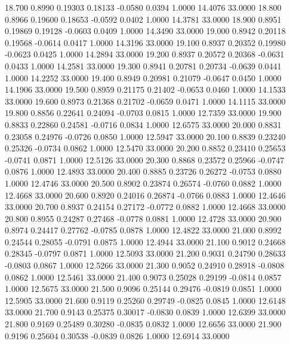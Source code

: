   18.700   0.8990   0.19303   0.18133  -0.0580   0.0394   1.0000  14.4076  33.0000
  18.800   0.8966   0.19600   0.18653  -0.0592   0.0402   1.0000  14.3781  33.0000
  18.900   0.8951   0.19869   0.19128  -0.0603   0.0409   1.0000  14.3490  33.0000
  19.000   0.8942   0.20118   0.19568  -0.0614   0.0417   1.0000  14.3196  33.0000
  19.100   0.8937   0.20352   0.19980  -0.0623   0.0425   1.0000  14.2894  33.0000
  19.200   0.8937   0.20572   0.20368  -0.0631   0.0433   1.0000  14.2581  33.0000
  19.300   0.8941   0.20781   0.20734  -0.0639   0.0441   1.0000  14.2252  33.0000
  19.400   0.8949   0.20981   0.21079  -0.0647   0.0450   1.0000  14.1906  33.0000
  19.500   0.8959   0.21175   0.21402  -0.0653   0.0460   1.0000  14.1533  33.0000
  19.600   0.8973   0.21368   0.21702  -0.0659   0.0471   1.0000  14.1115  33.0000
  19.800   0.8856   0.22641   0.24094  -0.0703   0.0815   1.0000  12.7359  33.0000
  19.900   0.8833   0.22860   0.24581  -0.0716   0.0834   1.0000  12.6575  33.0000
  20.000   0.8831   0.23058   0.24976  -0.0726   0.0850   1.0000  12.5947  33.0000
  20.100   0.8839   0.23240   0.25326  -0.0734   0.0862   1.0000  12.5470  33.0000
  20.200   0.8852   0.23410   0.25653  -0.0741   0.0871   1.0000  12.5126  33.0000
  20.300   0.8868   0.23572   0.25966  -0.0747   0.0876   1.0000  12.4893  33.0000
  20.400   0.8885   0.23726   0.26272  -0.0753   0.0880   1.0000  12.4746  33.0000
  20.500   0.8902   0.23874   0.26574  -0.0760   0.0882   1.0000  12.4668  33.0000
  20.600   0.8920   0.24016   0.26874  -0.0766   0.0883   1.0000  12.4646  33.0000
  20.700   0.8937   0.24154   0.27172  -0.0772   0.0882   1.0000  12.4668  33.0000
  20.800   0.8955   0.24287   0.27468  -0.0778   0.0881   1.0000  12.4728  33.0000
  20.900   0.8974   0.24417   0.27762  -0.0785   0.0878   1.0000  12.4822  33.0000
  21.000   0.8992   0.24544   0.28055  -0.0791   0.0875   1.0000  12.4944  33.0000
  21.100   0.9012   0.24668   0.28345  -0.0797   0.0871   1.0000  12.5093  33.0000
  21.200   0.9031   0.24790   0.28633  -0.0803   0.0867   1.0000  12.5266  33.0000
  21.300   0.9052   0.24910   0.28918  -0.0808   0.0862   1.0000  12.5461  33.0000
  21.400   0.9073   0.25028   0.29199  -0.0814   0.0857   1.0000  12.5675  33.0000
  21.500   0.9096   0.25144   0.29476  -0.0819   0.0851   1.0000  12.5905  33.0000
  21.600   0.9119   0.25260   0.29749  -0.0825   0.0845   1.0000  12.6148  33.0000
  21.700   0.9143   0.25375   0.30017  -0.0830   0.0839   1.0000  12.6399  33.0000
  21.800   0.9169   0.25489   0.30280  -0.0835   0.0832   1.0000  12.6656  33.0000
  21.900   0.9196   0.25604   0.30538  -0.0839   0.0826   1.0000  12.6914  33.0000
